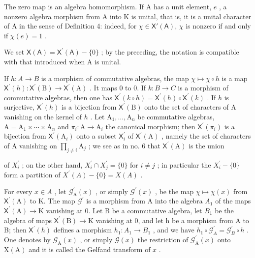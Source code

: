The zero map is an algebra homomorphism. If A has a unit element, \(e\) , a nonzero algebra morphism from A into K is unital, that is, it is a unital character of A in the sense of Definition 4: indeed, for \(\chi \in \mathsf{X}'(\mathsf{A})\), \(\chi\) is nonzero if and only if \(\chi(e) = 1\) .

We set \(\mathsf{X}(\mathsf{A})=\mathsf{X}^{\prime}(\mathsf{A})-\{0\}\) ; by the preceding, the notation is compatible with that introduced when A is unital.

If \(h\colon A\to B\) is a morphism of commutative algebras, the map \(\chi\mapsto\chi\circ h\) is a map \(\mathsf{X}^{\prime}(h)\colon\mathsf{X}^{\prime}(\mathrm{B})\to\mathsf{X}^{\prime}(\mathrm{A})\) . It maps 0 to 0. If \(k\colon B\to C\) is a morphism of commutative algebras, then one has \(\mathsf{X}^{\prime}(k\circ h)=\mathsf{X}^{\prime}(h)\circ\mathsf{X}^{\prime}(k)\) . If \(h\) is surjective, \(\mathsf{X}^{\prime}(h)\) is a bijection from \(\mathsf{X}^{\prime}(\mathrm{B})\) onto the set of characters of A vanishing on the kernel of \(h\) . Let \(\mathrm{A}_{1},\ldots,\mathrm{A}_{n}\) be commutative algebras, \(\mathrm{A}=\mathrm{A}_{1}\times\cdots\times\mathrm{A}_{n}\) and \(\pi_{i}\colon\mathrm{A}\to\mathrm{A}_{i}\) the canonical morphism; then \(\mathsf{X}^{\prime}(\pi_{i})\) is a bijection from \(\mathsf{X}^{\prime}(\mathrm{A}_{i})\) onto a subset \(\mathsf{X}_{i}^{\prime}\) of \(\mathsf{X}^{\prime}(\mathrm{A})\) , namely the set of characters of A vanishing on \(\prod_{j\neq i}\mathrm{A}_{j}\) ; we see as in no. 6 that \(\mathsf{X}^{\prime}(\mathrm{A})\) is the union

of \(X_{i}^{\prime}\) ; on the other hand, \(X_{i}^{\prime} \cap X_{j}^{\prime} = \{0\}\) for \(i \neq j\) ; in particular the \(X_{i}^{\prime} - \{0\}\) form a partition of \(X^{\prime}(A) - \{0\} = X(A)\) .

For every \(x \in A\) , let \(\mathcal{G}_{\mathrm{A}}^{\prime}(x)\) , or simply \(\mathcal{G}^{\prime}(x)\) , be the map \(\chi \mapsto \chi(x)\) from \(\mathsf{X}^{\prime}(\mathrm{A})\) to K. The map \(\mathcal{G}^{\prime}\) is a morphism from A into the algebra \(A_{1}\) of the maps \(\mathsf{X}^{\prime}(\mathrm{A}) \to \mathrm{K}\) vanishing at 0. Let B be a commutative algebra, let \(B_{1}\) be the algebra of maps \(\mathsf{X}^{\prime}(\mathrm{B}) \to \mathrm{K}\) vanishing at 0, and let h be a morphism from A to B; then \(\mathsf{X}^{\prime}(h)\) defines a morphism \(h_{1}: A_{1} \to B_{1}\) , and we have \(h_{1} \circ \mathcal{G}_{A}^{\prime} = \mathcal{G}_{B}^{\prime} \circ h\) . One denotes by \(\mathcal{G}_{\mathrm{A}}(x)\) , or simply \(\mathcal{G}(x)\) the restriction of \(\mathcal{G}_{\mathrm{A}}^{\prime}(x)\) onto \(\mathrm{X}(\mathrm{A})\) and it is called the Gelfand transform of \(x\) .

